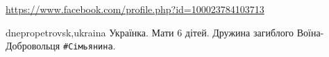  
 
 
 
 

\url{https://www.facebook.com/profile.php?id=100023784103713}\par
dnepropetrovsk,ukraina
Українка.
Мати 6 дітей. Дружина загиблого Воїна-Добровольця \verb|#Сімьянина|.
